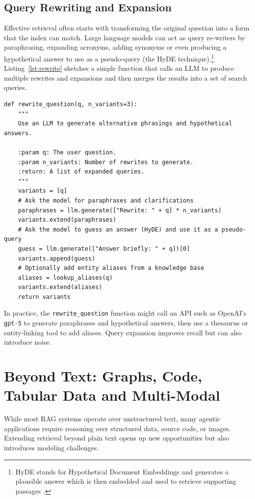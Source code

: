 \subsection{Query Rewriting and Expansion}

Effective retrieval often starts with transforming the original question into  a form that the index can match.  Large language models can act as query re-writers by paraphrasing, expanding acronyms, adding synonyms or even producing a hypothetical answer to use as a pseudo‑query (the HyDE technique).\footnote{HyDE stands for Hypothetical Document Embeddings and generates a plausible answer which is then embedded and used to retrieve supporting passages \citep{gao2023hyde}.}  Listing~\ref{lst:rewrite} sketches a simple function that calls an LLM to produce multiple rewrites and expansions and then merges the results into a set of search queries.

\begin{listing}[!ht]
\begin{verbatim}
def rewrite_question(q, n_variants=3):
    """
    Use an LLM to generate alternative phrasings and hypothetical answers.

    :param q: The user question.
    :param n_variants: Number of rewrites to generate.
    :return: A list of expanded queries.
    """
    variants = [q]
    # Ask the model for paraphrases and clarifications
    paraphrases = llm.generate(["Rewrite: " + q] * n_variants)
    variants.extend(paraphrases)
    # Ask the model to guess an answer (HyDE) and use it as a pseudo-query
    guess = llm.generate(["Answer briefly: " + q])[0]
    variants.append(guess)
    # Optionally add entity aliases from a knowledge base
    aliases = lookup_aliases(q)
    variants.extend(aliases)
    return variants
\end{verbatim}
\caption{A Simple Example of Query Rewriting}
\label{lst:rewrite}
\end{listing}


In practice, the \texttt{rewrite\_question} function might call an API such as OpenAI's \texttt{gpt-5} to generate paraphrases and hypothetical answers, then use a thesaurus or entity‑linking tool to add aliases.  Query expansion improves recall but can also introduce noise.




\section[Graphs, Code, Tabular Data]{Beyond Text: Graphs, Code, Tabular Data and Multi-Modal}
While most RAG systems operate over unstructured text, many agentic applications require reasoning over structured data, source code, or images.  Extending retrieval beyond plain text opens up new opportunities but also introduces modeling challenges.


